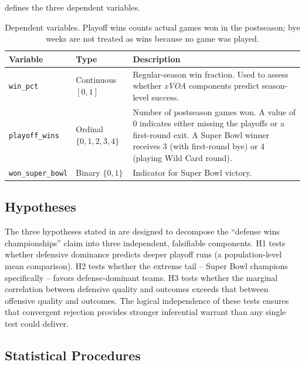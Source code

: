 \documentclass[12pt,a4paper]{article}
\newcommand{\xvoa}{\textit{xVOA}}
\begin{document}
 defines the three dependent variables.

\begin{table}[htbp]
  \centering
  \caption{Dependent variables. Playoff wins counts actual games won in the
           postseason; bye weeks are not treated as wins because no game was played.}
  \label{tab:dvs}
  \begin{tabularx}{\textwidth}{llX}
    \toprule
    \textbf{Variable} & \textbf{Type} & \textbf{Description} \\
    \midrule
    \texttt{win\_pct}
      & Continuous $[0, 1]$
      & Regular-season win fraction. Used to assess whether \xvoa{} components
        predict season-level success. \\[6pt]
    \texttt{playoff\_wins}
      & Ordinal $\{0, 1, 2, 3, 4\}$
      & Number of postseason games won. A value of 0 indicates either missing
        the playoffs or a first-round exit. A Super Bowl winner receives 3 (with
        first-round bye) or 4 (playing Wild Card round). \\[6pt]
    \texttt{won\_super\_bowl}
      & Binary $\{0, 1\}$
      & Indicator for Super Bowl victory. \\
    \bottomrule
  \end{tabularx}
\end{table}

\subsection{Hypotheses}
\label{sec:hypotheses}

The three hypotheses stated in  are designed to decompose the ``defense wins championships'' claim into three independent, falsifiable components. H1 tests whether defensive dominance predicts deeper playoff runs (a population-level mean comparison). H2 tests whether the extreme tail -- Super Bowl champions specifically -- favors defense-dominant teams. H3 tests whether the marginal correlation between defensive quality and outcomes exceeds that between offensive quality and outcomes. The logical independence of these tests ensures that convergent rejection provides stronger inferential warrant than any single test could deliver.

\subsection{Statistical Procedures}
\label{sec:procedures}
\end{document}
